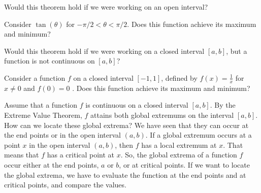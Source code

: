 \documentclass{ximera}
\begin{document}
\begin{question}
  Would this theorem hold if we were working on an open interval?
  \begin{multipleChoice}
  \end{multipleChoice}
  \begin{hint}
    Consider $\tan(\theta)$ for $-\pi/2 < \theta < \pi/2$. Does this function achieve its maximum and minimum? 
  \end{hint}
\end{question}
\begin{question}
\author{Nela Lakos}

  Would this theorem hold if we were working on a closed interval $[a,b]$, but a function is not continuous on $[a,b]$?
  \begin{multipleChoice}
  \end{multipleChoice}
  \begin{hint}
    Consider a function $f$   on a closed interval $[-1,1]$, defined by  $f(x)=\frac{1}{x}$ for $x\neq 0$ and $f(0)=0$ . Does this function achieve its maximum and minimum? 
  \end{hint}
\end{question}
Assume that a function $f$ is continuous on a closed interval $[a,b]$. By the Extreme Value Theorem, $f$ attains both global extremums on the interval $[a,b]$.
How can we locate these global extrema? We have seen that they can occur at the end points or in the open interval $(a,b)$.
If a global extremum occurs at a point $x$ in the open interval $(a,b)$, then $f$ has a local extremum at $x$. That means that $f$ has  a critical point at $x$.
So, the global extrema of a function  $f$ occur either at the end points, $a$ or $b$, or at critical points. If we want to locate the global extrema, we have to evaluate the function at the end points and at critical points, and compare the values. 
\end{document}
